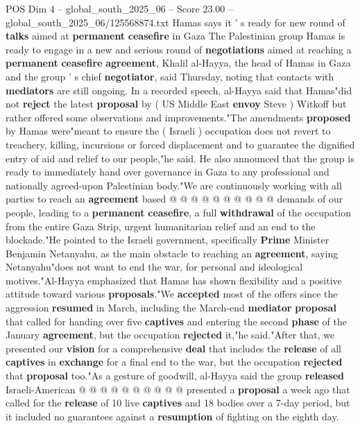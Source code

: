 \begin{textsample}{POS Dim 4 – global\_south\_2025\_06 – Score 23.00 – global\_south\_2025\_06/125568874.txt}  \label{ex:f4_pos_351}
Hamas says it ' s ready for new round of \textbf{talks} aimed at \textbf{permanent} \textbf{ceasefire} in Gaza The Palestinian group Hamas is ready to engage in a new and serious round of \textbf{negotiations} aimed at reaching a \textbf{permanent} \textbf{ceasefire} \textbf{agreement}, Khalil al-Hayya, the head of Hamas in Gaza and the group ' s chief \textbf{negotiator}, said Thursday, noting that contacts with \textbf{mediators} are still ongoing.
In a recorded speech, al-Hayya said that Hamas"did not \textbf{reject} the latest \textbf{proposal} by ( US Middle East \textbf{envoy} Steve ) Witkoff but rather offered some observations and improvements."The amendments \textbf{proposed} by Hamas were"meant to ensure the ( Israeli ) occupation does not revert to treachery, killing, incursions or forced displacement and to guarantee the dignified entry of aid and relief to our people,"he said.
He also announced that the group is ready to immediately hand over governance in Gaza to any professional and nationally agreed-upon Palestinian body."We are continuously working with all parties to reach an \textbf{agreement} based @ @ @ @ @ @ @ @ @ @ demands of our people, leading to a \textbf{permanent} \textbf{ceasefire}, a full \textbf{withdrawal} of the occupation from the entire Gaza Strip, urgent humanitarian relief and an end to the blockade."He pointed to the Israeli government, specifically \textbf{Prime} Minister Benjamin Netanyahu, as the main obstacle to reaching an \textbf{agreement}, saying Netanyahu"does not want to end the war, for personal and ideological motives."Al-Hayya emphasized that Hamas has shown flexibility and a positive attitude toward various \textbf{proposals}."We \textbf{accepted} most of the offers since the aggression \textbf{resumed} in March, including the March-end \textbf{mediator} \textbf{proposal} that called for handing over five \textbf{captives} and entering the second \textbf{phase} of the January \textbf{agreement}, but the occupation \textbf{rejected} it,"he said."After that, we presented our \textbf{vision} for a comprehensive \textbf{deal} that includes the \textbf{release} of all \textbf{captives} in \textbf{exchange} for a final end to the war, but the occupation \textbf{rejected} that \textbf{proposal} too."As a gesture of goodwill, al-Hayya said the group \textbf{released} Israeli-American @ @ @ @ @ @ @ @ @ @ presented a \textbf{proposal} a week ago that called for the \textbf{release} of 10 live \textbf{captives} and 18 bodies over a 7-day period, but it included no guarantees against a \textbf{resumption} of fighting on the eighth day.

\end{textsample}
